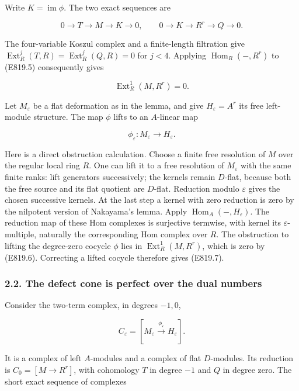 Write \(K=\operatorname{im}\phi\). The two exact sequences are

\[
 0\to T\to M\to K\to0,
 \qquad 0\to K\to R^r\to Q\to0.
 \tag{E819.5}
\]

The four-variable Koszul complex and a finite-length filtration give
\(\operatorname{Ext}^j_R(T,R)=\operatorname{Ext}^j_R(Q,R)=0\) for
\(j<4\). Applying \(\operatorname{Hom}_R(-,R^r)\) to (E819.5)
consequently gives

\[
 \operatorname{Ext}^1_R(M,R^r)=0.
 \tag{E819.6}
\]

Let \(M_\varepsilon\) be a flat deformation as in the lemma, and give
\(H_\varepsilon=A^r\) its free left-module structure. The map \(\phi\)
lifts to an \(A\)-linear map

\[
 \phi_\varepsilon:M_\varepsilon\longrightarrow H_\varepsilon.
 \tag{E819.7}
\]

Here is a direct obstruction calculation. Choose a finite free
resolution of \(M\) over the regular local ring \(R\). One can lift it
to a free resolution of \(M_\varepsilon\) with the same finite ranks:
lift generators successively; the kernels remain \(D\)-flat, because
both the free source and its flat quotient are \(D\)-flat. Reduction
modulo \(\varepsilon\) gives the chosen successive kernels. At the last
step a kernel with zero reduction is zero by the nilpotent version of
Nakayama's lemma. Apply \(\operatorname{Hom}_A(-,H_\varepsilon)\). The
reduction map of these Hom complexes is surjective termwise, with kernel
its \(\varepsilon\)-multiple, naturally the corresponding Hom complex
over \(R\). The obstruction to lifting the degree-zero cocycle \(\phi\)
lies in \(\operatorname{Ext}^1_R(M,R^r)\), which is zero by (E819.6).
Correcting a lifted cocycle therefore gives (E819.7).

\subsubsection{2.2. The defect cone is perfect over the dual
numbers}\label{SF-E819-the-defect-cone-is-perfect-over-the-dual-numbers}

Consider the two-term complex, in degrees \(-1,0\),

\[
 C_\varepsilon=[M_\varepsilon\xrightarrow{\phi_\varepsilon}H_\varepsilon].
 \tag{E819.8}
\]

It is a complex of left \(A\)-modules and a complex of flat
\(D\)-modules. Its reduction is \(C_0=[M\to R^r]\), with cohomology
\(T\) in degree \(-1\) and \(Q\) in degree zero. The short exact
sequence of complexes

